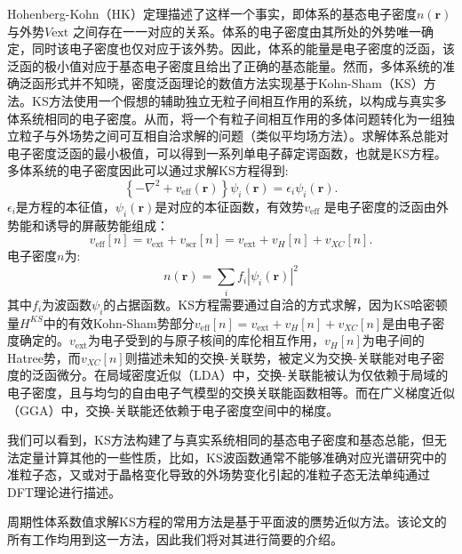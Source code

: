 Hohenberg-Kohn（HK）定理描述了这样一个事实，即体系的基态电子密度$n(\bm{r})$与外势$V\mathrm{ext}$ 之间存在一一对应的关系。体系的电子密度由其所处的外势唯一确定，同时该电子密度也仅对应于该外势。因此，体系的能量是电子密度的泛函，该泛函的极小值对应于基态电子密度且给出了正确的基态能量。然而，多体系统的准确泛函形式并不知晓，密度泛函理论的数值方法实现基于Kohn-Sham（KS）方法。KS方法使用一个假想的辅助独立无粒子间相互作用的系统，以构成与真实多体系统相同的电子密度。从而，将一个有粒子间相互作用的多体问题转化为一组独立粒子与外场势之间可互相自洽求解的问题（类似平均场方法）。求解体系总能对电子密度泛函的最小极值，可以得到一系列单电子薛定谔函数，也就是KS方程。多体系统的电子密度因此可以通过求解KS方程得到:
\begin{equation}
  \left\{ -\nabla^2 + v_{\mathrm{eff}}(\bm{r}) \right\}\psi_i(\bm{r}) = \epsilon_i \psi_i (\bm{r}).
\end{equation}
$\epsilon_i$是方程的本征值，$\psi_i(\bm{r})$是对应的本征函数，有效势$v_{\mathrm{eff}}$ 是电子密度的泛函由外势能和诱导的屏蔽势能组成：
\begin{equation}
  v_{\mathrm{eff}}[n] = v_{\mathrm{ext}} + v_{\mathrm{scr}}[n] =
  v_{\mathrm{ext}} + v_{H}[n] + v_{XC}[n].
\end{equation}
电子密度$n$为:
\begin{equation}
  n(\bm{r}) = \sum_i f_i |\psi_i(\bm{r})|^2
\end{equation}
其中$f_i$为波函数$\psi_i$的占据函数。KS方程需要通过自洽的方式求解，因为KS哈密顿量$H^{KS}$中的有效Kohn-Sham势部分$v_{\mathrm{eff}}[n]=v_{\mathrm{ext}} + v_{H}[n] + v_{XC}[n]$是由电子密度确定的。$v_{\mathrm{ext}}$为电子受到的与原子核间的库伦相互作用，$v_{H}[n]$为电子间的Hatree势，而$v_{XC}[n]$则描述未知的交换-关联势，被定义为交换-关联能对电子密度的泛函微分。在局域密度近似（LDA）中，交换-关联能被认为仅依赖于局域的电子密度，且与均匀的自由电子气模型的交换关联能函数相等。而在广义梯度近似（GGA）中，交换-关联能还依赖于电子密度空间中的梯度。

我们可以看到，KS方法构建了与真实系统相同的基态电子密度和基态总能，但无法定量计算其他的一些性质，比如，KS波函数通常不能够准确对应光谱研究中的准粒子态，又或对于晶格变化导致的外场势变化引起的准粒子态无法单纯通过DFT理论进行描述。

周期性体系数值求解KS方程的常用方法是基于平面波的赝势近似方法。该论文的所有工作均用到这一方法，因此我们将对其进行简要的介绍。

